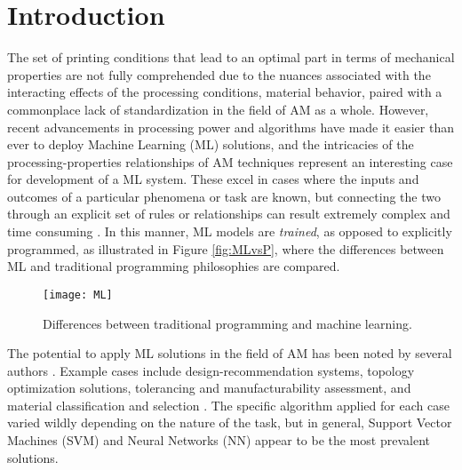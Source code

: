 \documentclass[main.tex]{subfiles}
\begin{document}
\section{Introduction} \label{sec:ml_intr}

The set of printing conditions that lead to an optimal part in terms of mechanical properties are not fully comprehended due to the nuances associated with the interacting effects of the processing conditions, material behavior, paired with a commonplace lack of standardization in the field of AM as a whole. However, recent advancements in processing power and algorithms have made it easier than ever to deploy Machine Learning (ML) solutions, and the intricacies of the processing-properties relationships of AM techniques represent an interesting case for development of a ML system. These excel in cases where the inputs and outcomes of a particular phenomena or task are known, but connecting the two through an explicit set of rules or relationships can result extremely complex and time consuming \cite{Chollet2018}. In this manner, ML models are \emph{trained}, as opposed to explicitly programmed, as illustrated in Figure \ref{fig:MLvsP}, where the differences between ML and traditional programming philosophies are compared. 

\begin{figure}[!htbp]
	\center
	\texttt{[image: ML]}
	\caption{Differences between traditional programming and machine learning. \cite{Chollet2018}} \label{fig:MLvsP_2}
\end{figure}

The potential to apply ML solutions in the field of AM has been noted by several authors \cite{Razvi2019,Meng2020}. Example cases include design-recommendation systems, topology optimization solutions, tolerancing and manufacturability assessment, and material classification and selection \cite{Razvi2019}. The specific algorithm applied for each case varied wildly depending on the nature of the task, but in general, Support Vector Machines (SVM) and Neural Networks (NN) appear to be the most prevalent solutions.
\end{document}
